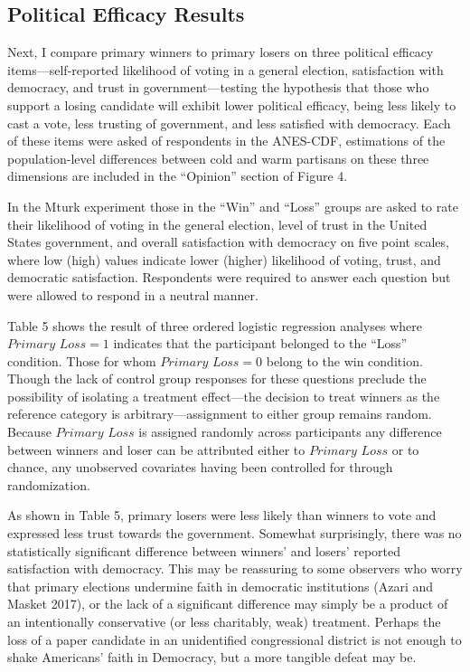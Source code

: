 \documentclass[
]{article}
\begin{document}
\hypertarget{political-efficacy-results}{%
\subsection{Political Efficacy Results}\label{political-efficacy-results}}

Next, I compare primary winners to primary losers on three political efficacy items---self-reported likelihood of voting in a general election, satisfaction with democracy, and trust in government---testing the hypothesis that those who support a losing candidate will exhibit lower political efficacy, being less likely to cast a vote, less trusting of government, and less satisfied with democracy. Each of these items were asked of respondents in the ANES-CDF, estimations of the population-level differences between cold and warm partisans on these three dimensions are included in the ``Opinion'' section of Figure 4.

In the Mturk experiment those in the ``Win'' and ``Loss'' groups are asked to rate their likelihood of voting in the general election, level of trust in the United States government, and overall satisfaction with democracy on five point scales, where low (high) values indicate lower (higher) likelihood of voting, trust, and democratic satisfaction. Respondents were required to answer each question but were allowed to respond in a neutral manner.

Table 5 shows the result of three ordered logistic regression analyses where \(\textit{Primary Loss} = 1\) indicates that the participant belonged to the ``Loss'' condition. Those for whom \(\textit{Primary Loss} = 0\) belong to the win condition. Though the lack of control group responses for these questions preclude the possibility of isolating a treatment effect---the decision to treat winners as the reference category is arbitrary---assignment to either group remains random. Because \(\textit{Primary Loss}\) is assigned randomly across participants any difference between winners and loser can be attributed either to \(\textit{Primary Loss}\) or to chance, any unobserved covariates having been controlled for through randomization.

As shown in Table 5, primary losers were less likely than winners to vote and expressed less trust towards the government. Somewhat surprisingly, there was no statistically significant difference between winners' and losers' reported satisfaction with democracy. This may be reassuring to some observers who worry that primary elections undermine faith in democratic institutions (Azari and Masket 2017), or the lack of a significant difference may simply be a product of an intentionally conservative (or less charitably, weak) treatment. Perhaps the loss of a paper candidate in an unidentified congressional district is not enough to shake Americans' faith in Democracy, but a more tangible defeat may be.
\end{document}
